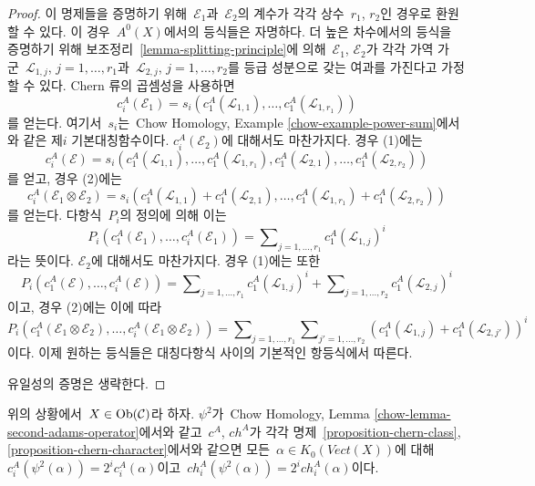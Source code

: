\begin{proof}
\medskip\noindent
이 명제들을 증명하기 위해\  $\mathcal{E}_1$과\  $\mathcal{E}_2$의
계수가 각각 상수\  $r_1$, $r_2$인 경우로 환원할 수 있다. 이 경우\ 
$A^0(X)$에서의 등식들은 자명하다. 더 높은 차수에서의 등식을
증명하기 위해 보조정리\  \ref{lemma-splitting-principle}에 의해\ 
$\mathcal{E}_1$, $\mathcal{E}_2$가 각각 가역 가군\ 
$\mathcal{L}_{1, j}$, $j = 1, \ldots, r_1$과\ 
$\mathcal{L}_{2, j}$, $j = 1, \ldots, r_2$를 등급 성분으로 갖는
여과를 가진다고 가정할 수 있다. Chern 류의 곱셈성을 사용하면
$$
c_i^A(\mathcal{E}_1) =
s_i(c_1^A(\mathcal{L}_{1, 1}), \ldots, c_1^A(\mathcal{L}_{1, r_1}))
$$
를 얻는다. 여기서\  $s_i$는\  Chow Homology, Example
\ref{chow-example-power-sum}에서와 같은 제$i$ 기본대칭함수이다.
$c_i^A(\mathcal{E}_2)$에 대해서도 마찬가지다. 경우 (1)에는
$$
c_i^A(\mathcal{E}) =
s_i(c_1^A(\mathcal{L}_{1, 1}), \ldots, c_1^A(\mathcal{L}_{1, r_1}),
c_1^A(\mathcal{L}_{2, 1}), \ldots, c_1^A(\mathcal{L}_{2, r_2}))
$$
를 얻고, 경우 (2)에는
$$
c_i^A(\mathcal{E}_1 \otimes \mathcal{E}_2) =
s_i(c_1^A(\mathcal{L}_{1, 1}) + c_1^A(\mathcal{L}_{2, 1}),
\ldots, c_1^A(\mathcal{L}_{1, r_1}) + c_1^A(\mathcal{L}_{2, r_2}))
$$
를 얻는다. 다항식\  $P_i$의 정의에 의해 이는
$$
P_i(c^A_1(\mathcal{E}_1), \ldots, c^A_i(\mathcal{E}_1)) =
\sum\nolimits_{j = 1, \ldots, r_1} c_1^A(\mathcal{L}_{1, j})^i
$$
라는 뜻이다. $\mathcal{E}_2$에 대해서도 마찬가지다. 경우 (1)에는
또한
$$
P_i(c^A_1(\mathcal{E}), \ldots, c^A_i(\mathcal{E})) =
\sum\nolimits_{j = 1, \ldots, r_1} c_1^A(\mathcal{L}_{1, j})^i +
\sum\nolimits_{j = 1, \ldots, r_2} c_1^A(\mathcal{L}_{2, j})^i
$$
이고, 경우 (2)에는 이에 따라
$$
P_i(c^A_1(\mathcal{E}_1 \otimes \mathcal{E}_2), \ldots,
c^A_i(\mathcal{E}_1 \otimes \mathcal{E}_2)) =
\sum\nolimits_{j = 1, \ldots, r_1}
\sum\nolimits_{j' = 1, \ldots, r_2}
(c_1^A(\mathcal{L}_{1, j}) + c_1^A(\mathcal{L}_{2, j'}))^i
$$
이다. 이제 원하는 등식들은 대칭다항식 사이의 기본적인 항등식에서
따른다.

\medskip\noindent
유일성의 증명은 생략한다.
\end{proof}

\begin{lemma}
\label{lemma-adams-and-chern}
위의 상황에서\  $X \in \mathop{\mathrm{Ob}}\nolimits(\mathcal{C})$라 하자. $\psi^2$가\  Chow
Homology, Lemma \ref{chow-lemma-second-adams-operator}에서와 같고\ 
$c^A$, $ch^A$가 각각 명제\  \ref{proposition-chern-class},
\ref{proposition-chern-character}에서와 같으면 모든\ 
$\alpha \in K_0(\textit{Vect}(X))$에 대해\ 
$c^A_i(\psi^2(\alpha)) = 2^i c^A_i(\alpha)$이고\ 
$ch^A_i(\psi^2(\alpha)) = 2^i ch^A_i(\alpha)$이다.
\end{lemma}

